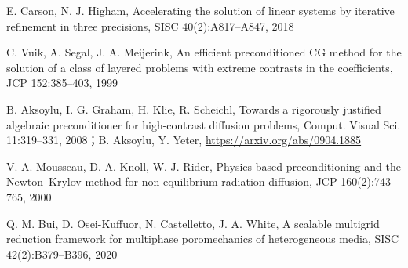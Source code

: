\documentclass[11pt,a4paper]{ctexart}
\begin{document}
\begin{enumerate}[label={[\arabic*]},itemsep=1pt]
\item E. Carson, N. J. Higham, Accelerating the solution of linear systems by iterative refinement in three precisions, SISC 40(2):A817--A847, 2018
\item C. Vuik, A. Segal, J. A. Meijerink, An efficient preconditioned CG method for the solution of a class of layered problems with extreme contrasts in the coefficients, JCP 152:385--403, 1999
\item B. Aksoylu, I. G. Graham, H. Klie, R. Scheichl, Towards a rigorously justified algebraic preconditioner for high-contrast diffusion problems, Comput. Visual Sci. 11:319--331, 2008；B. Aksoylu, Y. Yeter, \url{https://arxiv.org/abs/0904.1885}
\item V. A. Mousseau, D. A. Knoll, W. J. Rider, Physics-based preconditioning and the Newton--Krylov method for non-equilibrium radiation diffusion, JCP 160(2):743--765, 2000
\item Q. M. Bui, D. Osei-Kuffuor, N. Castelletto, J. A. White, A scalable multigrid reduction framework for multiphase poromechanics of heterogeneous media, SISC 42(2):B379--B396, 2020
\end{enumerate}
\end{document}
